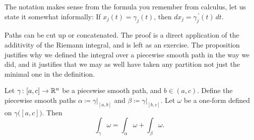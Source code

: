 The notation makes sense from the formula you remember from calculus,
let us state it somewhat informally:
If $x_j(t) = \gamma_j(t)$, then $dx_j = \gamma_j^{\:\prime}(t) \, dt$.

Paths can be cut up or concatenated.  The proof is a direct application
of the additivity of the Riemann integral, and is left as an exercise.
The proposition justifies why we defined the integral over a piecewise
smooth path in the way we did, and it justifies that we may as well
have taken any partition not just the minimal one in the definition.

\begin{prop} \label{mv:prop:pathconcat}
Let $\gamma \colon [a,c] \to {\mathbb{R}}^n$ be a piecewise smooth path,
and $b \in (a,c)$.
Define the piecewise smooth paths
$\alpha \coloneqq \gamma|_{[a,b]}$ and
$\beta \coloneqq \gamma|_{[b,c]}$.
Let $\omega$ be a one-form defined on
$\gamma\bigl([a,c]\bigr)$.  Then
\begin{equation*}
\int_{\gamma} \omega =
\int_{\alpha} \omega +
\int_{\beta} \omega .
\end{equation*}
\end{prop}


